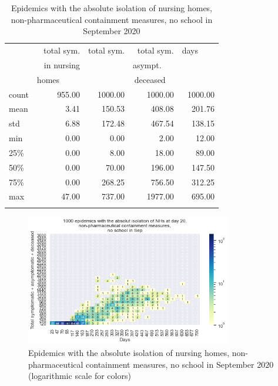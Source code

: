 \documentclass[graybox]{svmult}
\begin{document}
\begin{table}[t]
\center
\small
\begin{tabular}{lrrrr}
\hline\noalign{\smallskip}
{} & total sym.        &  total sym. & total sym.     & days~~~~ \\
{} & in nursing        &                  & asympt.~~~  & \\
{} & homes~~~~~  &                  & deceased~~ & \\
\noalign{\smallskip}\svhline\noalign{\smallskip}
count &     955.00 &             1000.00 &                 1000.00 & 1000.00 \\
mean  &       3.41 &              150.53 &                  408.08 &  201.76 \\
std   &       6.88 &              172.48 &                  467.54 &  138.15 \\
min   &       0.00 &                0.00 &                    2.00 &   12.00 \\
25\%   &       0.00 &                8.00 &                   18.00 &   89.00 \\
50\%   &       0.00 &               70.00 &                  196.00 &  147.50 \\
75\%   &       0.00 &              268.25 &                  756.50 &  312.25 \\
max   &      47.00 &              737.00 &                 1977.00 &  695.00 \\
\hline\noalign{\smallskip}
\end{tabular}

\label{EpidemicsNHsT}
\caption{Epidemics with the absolute isolation of nursing homes, non-pharmaceutical containment measures, no school in September 2020}
\end{table}


\begin{figure}[t]
\begin{center}
\includegraphics[width=0.8\textwidth]{HM30_readRunResults1k_with_NH_OP_BZ_at20_plusHMlog.png}
\caption{Epidemics with the absolute isolation of nursing homes, non-pharmaceutical containment measures, no school in September 2020 (logarithmic scale for colors)}
\label{EpidemicsNHsHM}
\end{center}
\end{figure}
\end{document}
